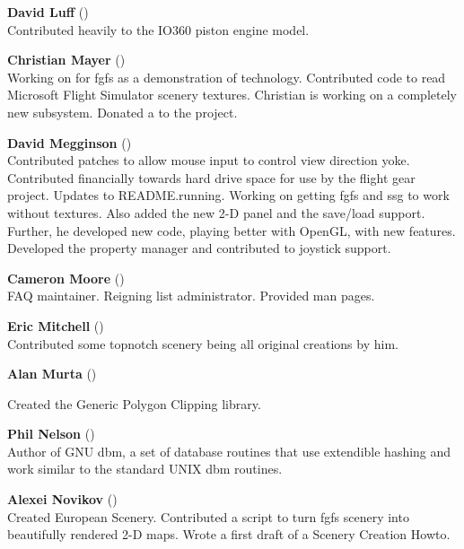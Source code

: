 \noindent \textbf{David Luff} ()\\
 Contributed heavily to the IO360 piston engine model.
 \medskip

\noindent \textbf{Christian Mayer}
()\\
 Working on  for fgfs as a demonstration of technology.
 Contributed code to read Microsoft Flight Simulator scenery textures. Christian is working on a completely new  subsystem.
 Donated a  to the project.
 \medskip

\noindent \textbf{David Megginson} ()\\
  Contributed patches to allow mouse input to control view direction yoke.
  Contributed financially towards hard drive space for use by the
  flight gear project. Updates to README.running.
  Working on getting fgfs and ssg to work without textures.
  Also added the new 2-D panel and the save/load support.
  Further, he developed new  code, playing better with OpenGL, with new features.
  Developed the property manager and contributed to joystick support.
 \medskip

 \medskip

\noindent \textbf{Cameron Moore}
()\\
 FAQ maintainer. Reigning list administrator. Provided man pages.
 \medskip

\noindent \textbf{Eric Mitchell} ()\\
  Contributed some topnotch scenery  being all original creations by him.
 \medskip

\noindent \textbf{Alan Murta} ()
 \medskip

   \medskip

  \noindent
  Created the Generic Polygon Clipping library.
 \medskip

\noindent \textbf{Phil Nelson} ()\\
  Author of GNU dbm, a set of database routines that use extendible hashing and work
  similar to the standard UNIX dbm routines.
  \medskip

\noindent \textbf{Alexei Novikov}
()\\
  Created European Scenery. Contributed a script to turn fgfs scenery into beautifully rendered
  2-D maps. Wrote a first draft of a Scenery Creation Howto.
  \medskip

